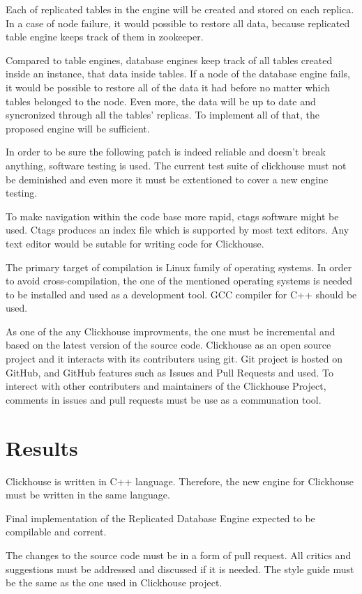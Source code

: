 \documentclass[conference]{IEEEtran}
\begin{document}
Each of replicated tables in the engine will be created and stored on each replica.
In a case of node failure, it would possible to restore all data, because replicated
table engine keeps track of them in zookeeper.

Compared to table engines, database engines keep track of all tables created inside an
instance, that data inside tables. If a node of the database engine fails, it would
be possible to restore all of the data it had before no matter which tables belonged
to the node. Even more, the data will be up to date and syncronized through all the tables'
replicas. To implement all of that, the proposed engine will be sufficient.

In order to be sure the following patch is indeed reliable and doesn't break anything,
software testing is used. The current test suite of clickhouse must not be
deminished and even more it must be extentioned to cover a new engine testing.

To make navigation within the code base more
rapid, ctags software might be used. Ctags produces an index file which is supported
by most text editors.
Any text editor would be sutable for writing code for Clickhouse.

The primary target of compilation is Linux family of operating systems.
In order to avoid cross-compilation, the one of the mentioned operating systems
is needed to be installed and used as a development tool. GCC compiler for C++ should be used.

As one of the any Clickhouse improvments, the one must be incremental and based
on the latest version of the source code. Clickhouse as an open source project and it
interacts with its contributers using git. Git project is hosted on GitHub, and
GitHub features such as Issues and Pull Requests and used. To interect with other
contributers and maintainers of the Clickhouse Project, comments in issues and
pull requests must be use as a communation tool.

\section{Results}
Clickhouse is written in C++ language. Therefore, the new engine for Clickhouse
must be written in the same language.

Final implementation of the Replicated Database Engine expected to be compilable
and corrent.

The changes to the source code must be in a form of pull request. All critics and suggestions
must be addressed and discussed if it is needed. The style guide must be the same as
the one used in Clickhouse project.
\end{document}
